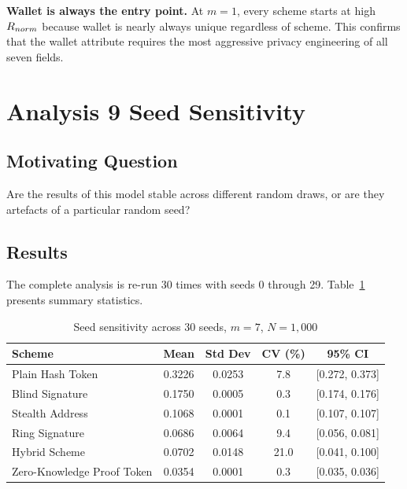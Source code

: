 \textbf{Wallet is always the entry point.} At $m = 1$, every
scheme starts at high $R_{norm}$ because wallet is nearly
always unique regardless of scheme. This confirms that the
wallet attribute requires the most aggressive privacy
engineering of all seven fields.

\section{Analysis 9 Seed Sensitivity}\label{sec:a9}

\subsection{Motivating Question}

Are the results of this model stable across different random
draws, or are they artefacts of a particular random seed?

\subsection{Results}

The complete analysis is re-run 30 times with seeds 0 through
29. Table~\ref{tab:a9_results} presents summary statistics.

\begin{table}[H]
\centering
\caption{Seed sensitivity across 30 seeds, $m = 7$,
$N = 1{,}000$}
\label{tab:a9_results}
\begin{tabular}{lcccc}
\toprule
\textbf{Scheme} & \textbf{Mean} & \textbf{Std Dev} &
\textbf{CV (\%)} & \textbf{95\% CI}\\
\midrule
Plain Hash Token  & 0.3226 & 0.0253 & 7.8  & [0.272, 0.373]\\
Blind Signature   & 0.1750 & 0.0005 & 0.3  & [0.174, 0.176]\\
Stealth Address   & 0.1068 & 0.0001 & 0.1  & [0.107, 0.107]\\
Ring Signature    & 0.0686 & 0.0064 & 9.4  & [0.056, 0.081]\\
Hybrid Scheme     & 0.0702 & 0.0148 & 21.0 & [0.041, 0.100]\\
Zero-Knowledge Proof Token         & 0.0354 & 0.0001 & 0.3  & [0.035, 0.036]\\
\bottomrule
\end{tabular}
\end{table}

